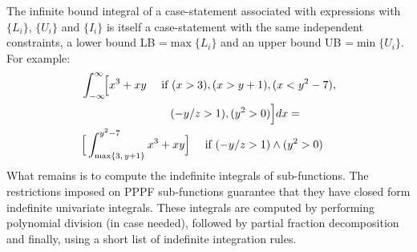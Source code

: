 \documentclass[letterpaper]{article}
\newcommand{\singlecase}[2]{#2 \quad \text{ if } #1}
\begin{document}
The infinite bound integral of a case-statement 
associated with expressions with $\{L_i\}$, $\{U_i\}$ and $\{I_i\}$ 
is itself a case-statement with the same independent constraints,
a lower bound LB =$\max\{L_i\}$ and 
an upper bound UB =$ \min\{U_i\}$.
For example:
{\footnotesize 
\begin{align*}
&\int_{-\infty}^{\infty}\!\! \Big[
\singlecase{(x>3), (x>y+1), (x<y^2-7), \\
&\hspace{28mm} (-y/z > 1) , (y^2>0)}
{x^3 + xy} \Big] dx = \\
&\singlecase{(-y/z > 1) \wedge (y^2>0)}
{\Big[ \int_{\max\{3, \, y+1\}}^{y^2 - 7}x^3 + xy \Big]} 
\end{align*}  
}
What remains is to compute the indefinite integrals of sub-functions. 
The restrictions imposed on PPPF sub-functions 
guarantee that they have closed form indefinite univariate integrals.
These integrals are computed by performing polynomial division (in case needed),
followed by partial fraction decomposition and finally, using a short list of indefinite integration rules.
\end{document}

